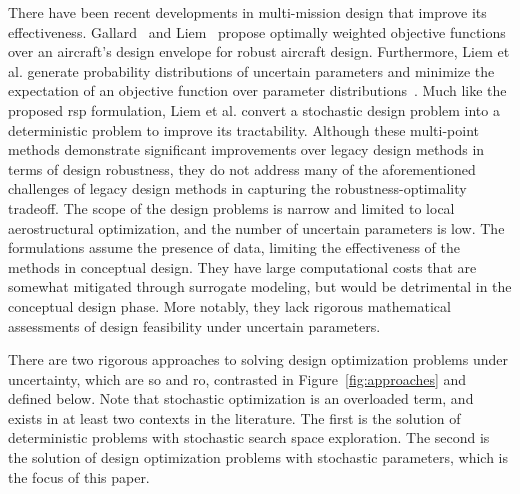 {\color{blue}There have been recent developments in multi-mission design that improve its effectiveness.
Gallard~\cite{Gallard2013} and Liem~\cite{Liem2015} propose optimally
weighted objective functions over an aircraft's
design envelope for robust aircraft design.
Furthermore, Liem et al. generate probability distributions
of uncertain parameters and minimize the expectation of an objective function over
parameter distributions~\cite{Liem2017}. Much like the proposed \gls{rsp} formulation,
Liem et al. convert a stochastic design problem into a deterministic problem
to improve its tractability.
Although these multi-point methods demonstrate significant improvements over
legacy design methods in terms of design robustness,
they do not address many of the aforementioned challenges of legacy design methods
in capturing the robustness-optimality tradeoff.
The scope of the design problems is narrow and limited to local aerostructural optimization,
and the number of uncertain parameters is low.
The formulations assume the presence of data, limiting the
effectiveness of the methods in conceptual design.
They have large computational costs that are somewhat mitigated through
surrogate modeling, but would be detrimental in the conceptual design phase.
More notably, they lack rigorous mathematical assessments of design feasibility
under uncertain parameters.}

There are two rigorous approaches to solving design optimization problems under uncertainty,
which are \gls{so} and \gls{ro}, contrasted in Figure~\ref{fig:approaches} and defined below. Note that stochastic
optimization is an overloaded term, and exists in at least two contexts in the literature. The first is the solution
of deterministic problems with stochastic search space exploration. The second is the solution
of design optimization problems with stochastic parameters, which is the focus of this paper.

